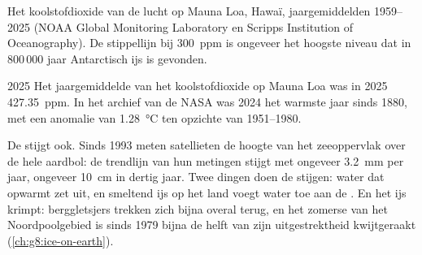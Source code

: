 \begin{omfigure}

{\small Het koolstofdioxide van de lucht op Mauna Loa, Hawaï,
jaargemiddelden 1959--2025 (NOAA Global Monitoring Laboratory en Scripps
Institution of Oceanography). De stippellijn bij \qty{300}{ppm} is
ongeveer het hoogste niveau dat in 800\,000 jaar Antarctisch ijs is
gevonden.}
\label{fig:g9:climate-past-and-present:co2}
\end{omfigure}

\begin{dated}{2025}
Het jaargemiddelde van het koolstofdioxide op Mauna Loa was in 2025
\qty{427.35}{ppm}. In het archief van de NASA was 2024 het warmste jaar
sinds 1880, met een anomalie van \qty{1.28}{\degreeCelsius} ten opzichte
van 1951--1980.
\end{dated}

De  stijgt ook. Sinds 1993 meten satellieten de hoogte van het
zeeoppervlak over de hele aardbol: de trendlijn van hun metingen stijgt
met ongeveer \qty{3.2}{mm} per jaar, ongeveer \qty{10}{cm} in dertig jaar.
Twee dingen doen de  stijgen: water dat opwarmt zet uit, en smeltend
ijs op het land voegt water toe aan de . En het ijs krimpt:
berggletsjers trekken zich bijna overal terug, en het zomerse  van
het Noordpoolgebied is sinds 1979 bijna de helft van zijn uitgestrektheid
kwijtgeraakt (\cref{ch:g8:ice-on-earth}).

